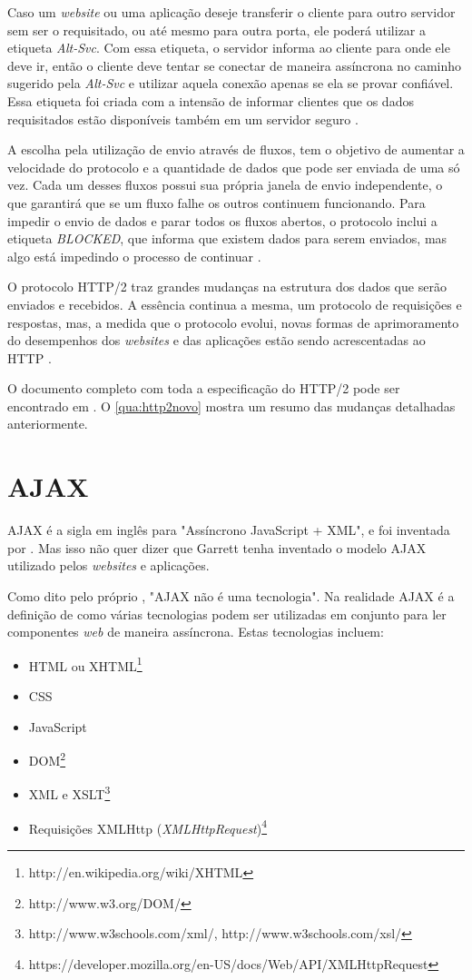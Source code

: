 Caso um \textit{website} ou uma aplicação deseje transferir o cliente para outro servidor sem ser o requisitado, ou até mesmo para outra porta, ele poderá utilizar a etiqueta \textit{Alt-Svc}. Com essa etiqueta, o servidor informa ao cliente para onde ele deve ir, então o cliente deve tentar se conectar de maneira assíncrona no caminho sugerido pela \textit{Alt-Svc} e utilizar aquela conexão apenas se ela se provar confiável. Essa etiqueta foi criada com a intensão de informar clientes que os dados requisitados estão disponíveis também em um servidor seguro \cite{HTTP2Explained}.

A escolha pela utilização de envio através de fluxos, tem o objetivo de aumentar a velocidade do protocolo e a quantidade de dados que pode ser enviada de uma só vez. Cada um desses fluxos possui sua própria janela de envio independente, o que garantirá que se um fluxo falhe os outros continuem funcionando. Para impedir o envio de dados e parar todos os fluxos abertos, o protocolo inclui a etiqueta \textit{BLOCKED}, que informa que existem dados para serem enviados, mas algo está impedindo o processo de continuar \cite{HTTP2Explained}.

O protocolo HTTP/2 traz grandes mudanças na estrutura dos dados que serão enviados e recebidos. A essência continua a mesma, um protocolo de requisições e respostas, mas, a medida que o protocolo evolui, novas formas de aprimoramento do desempenhos dos \textit{websites} e das aplicações estão sendo acrescentadas ao HTTP \cite{HTTP2Explained}.

O documento completo com toda a especificação do HTTP/2 pode ser encontrado em . O \autoref{qua:http2novo} mostra um resumo das mudanças detalhadas anteriormente.



\newpage
\section{AJAX}
\label{sec:ajax}
AJAX é a sigla em inglês para "Assíncrono JavaScript + XML", e foi inventada por . Mas isso não quer dizer que Garrett tenha inventado o modelo AJAX utilizado pelos \textit{websites} e aplicações.

Como dito pelo próprio , "AJAX não é uma tecnologia". Na realidade AJAX é a definição de como várias tecnologias podem ser utilizadas em conjunto para ler componentes \textit{web} de maneira assíncrona. Estas tecnologias incluem:
	\begin{itemize}
		\item HTML ou XHTML\footnote{http://en.wikipedia.org/wiki/XHTML}
		\item CSS
		\item JavaScript
		\item DOM\footnote{http://www.w3.org/DOM/}
		\item XML e XSLT\footnote{http://www.w3schools.com/xml/, http://www.w3schools.com/xsl/}
		\item Requisições XMLHttp (\textit{XMLHttpRequest})\footnote{https://developer.mozilla.org/en-US/docs/Web/API/XMLHttpRequest}
	\end{itemize}


